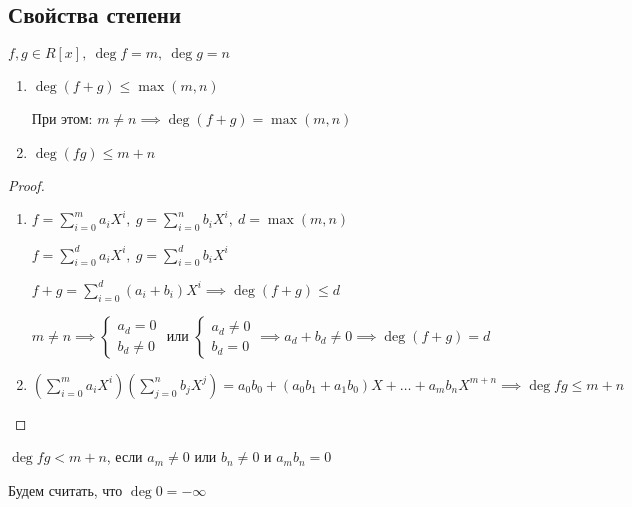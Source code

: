 \subsection{Свойства степени}

\begin{theorem-non}
    $f, g \in R[x],~\deg f = m,~\deg g = n$

    \begin{enumerate}
        \item $\deg(f + g) \leq \max(m, n)$
        
        При этом: $m \neq n \implies \deg(f + g) = \max(m, n)$

        
        \item $\deg(fg) \leq m + n$
    \end{enumerate}
\end{theorem-non}

\begin{proof}
    \begin{enumerate}
        \item $f = \sum\limits_{i = 0}^m a_i X^i,~g = \sum\limits_{i = 0}^n b_i X^i,~d = \max(m, n)$
        
        $f = \sum\limits_{i = 0}^d a_i X^i,~g = \sum\limits_{i = 0}^d b_i X^i$

        $f + g = \sum\limits_{i = 0}^d (a_i + b_i) X^i \implies \deg(f + g) \leq d$

        $m \neq n \implies \begin{cases}
            a_d = 0\\
            b_d \neq 0
        \end{cases}$ или $\begin{cases}
            a_d \neq 0\\
            b_d = 0
        \end{cases} \implies a_d + b_d \neq 0 \implies \deg(f + g) = d$


        \item $\left( \sum\limits_{i = 0}^m a_iX^i \right) \left( \sum\limits_{j = 0}^n b_jX^j \right) = a_0b_0 + (a_0b_1 + a_1b_0)X + \ldots + a_mb_nX^{m+n} \implies \deg fg \leq m + n$
    \end{enumerate}
\end{proof}

\begin{notice}
    $\deg fg < m + n$, если $a_m \neq 0$ или $b_n \neq 0$ и $a_m b_n = 0$
\end{notice}

\begin{notice}
    Будем считать, что $\deg 0 = -\infty$
\end{notice}

